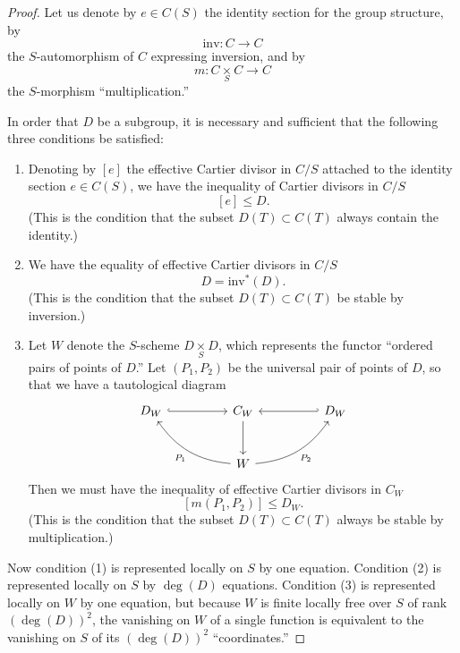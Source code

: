 \begin{proof}
Let us denote by $e \in C(S)$ the identity section for the group structure, by
\[
\mathrm{inv} \colon C \longrightarrow C
\]
the $S$-automorphism of $C$ expressing inversion, and by
\[
m \colon C \underset{S}{\times} C \longrightarrow C
\]
the $S$-morphism ``multiplication.''

In order that $D$ be a subgroup, it is necessary and sufficient that the following three conditions be satisfied:
\begin{enumerate}[(1)]
\item Denoting by $[e]$ the effective Cartier divisor in $C/S$ attached to the identity section $e \in C(S)$, we have the inequality of Cartier divisors in $C/S$
\[
[e] \le D.
\]
(This is the condition that the subset $D(T) \subset C(T)$ always contain the identity.)
\item We have the equality of effective Cartier divisors in $C/S$
\[
D = \mathrm{inv}^*(D).
\]
(This is the condition that the subset $D(T) \subset C(T)$ be stable by inversion.)
\item Let $W$ denote the $S$-scheme $D \underset{S}{\times} D$, which represents the functor ``ordered pairs of points of $D$.'' Let $(P_1, P_2)$ be the universal pair of points of $D$, so that we have a tautological diagram
\[
\begin{tikzcd}[column sep=huge, row sep=large]
D_W \arrow[r, hook] & C_W \arrow[d] & D_W \arrow[l, hook'] \\
& W \arrow[lu, bend left=25, "P_1"] \arrow[ru, bend right=25, "P_2"'] &
\end{tikzcd}
\]
Then we must have the inequality of effective Cartier divisors in $C_W$
\[
[m(P_1, P_2)] \le D_W.
\]
(This is the condition that the subset $D(T) \subset C(T)$ always be stable by multiplication.)
\end{enumerate}

Now condition (1) is represented locally on $S$ by one equation. Condition (2) is represented locally on $S$ by $\deg(D)$ equations. Condition (3) is represented locally on $W$ by one equation, but because $W$ is finite locally free over $S$ of rank $(\deg(D))^2$, the vanishing on $W$ of a single function is equivalent to the vanishing on $S$ of its $(\deg(D))^2$ ``coordinates.''
\end{proof}

